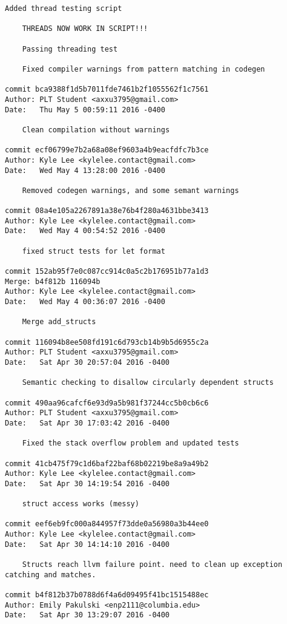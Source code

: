 \begin{lstlisting}[backgroundcolor=\color{white}]
    Added thread testing script
    
    THREADS NOW WORK IN SCRIPT!!!
    
    Passing threading test
    
    Fixed compiler warnings from pattern matching in codegen

commit bca9388f1d5b7011fde7461b2f1055562f1c7561
Author: PLT Student <axxu3795@gmail.com>
Date:   Thu May 5 00:59:11 2016 -0400

    Clean compilation without warnings

commit ecf06799e7b2a68a08ef9603a4b9eacfdfc7b3ce
Author: Kyle Lee <kylelee.contact@gmail.com>
Date:   Wed May 4 13:28:00 2016 -0400

    Removed codegen warnings, and some semant warnings

commit 08a4e105a2267891a38e76b4f280a4631bbe3413
Author: Kyle Lee <kylelee.contact@gmail.com>
Date:   Wed May 4 00:54:52 2016 -0400

    fixed struct tests for let format

commit 152ab95f7e0c087cc914c0a5c2b176951b77a1d3
Merge: b4f812b 116094b
Author: Kyle Lee <kylelee.contact@gmail.com>
Date:   Wed May 4 00:36:07 2016 -0400

    Merge add_structs

commit 116094b8ee508fd191c6d793cb14b9b5d6955c2a
Author: PLT Student <axxu3795@gmail.com>
Date:   Sat Apr 30 20:57:04 2016 -0400

    Semantic checking to disallow circularly dependent structs

commit 490aa96cafcf6e93d9a5b981f37244cc5b0cb6c6
Author: PLT Student <axxu3795@gmail.com>
Date:   Sat Apr 30 17:03:42 2016 -0400

    Fixed the stack overflow problem and updated tests

commit 41cb475f79c1d6baf22baf68b02219be8a9a49b2
Author: Kyle Lee <kylelee.contact@gmail.com>
Date:   Sat Apr 30 14:19:54 2016 -0400

    struct access works (messy)

commit eef6eb9fc000a844957f73dde0a56980a3b44ee0
Author: Kyle Lee <kylelee.contact@gmail.com>
Date:   Sat Apr 30 14:14:10 2016 -0400

    Structs reach llvm failure point. need to clean up exception catching and matches.

commit b4f812b37b0788d6f4a6d09495f41bc1515488ec
Author: Emily Pakulski <enp2111@columbia.edu>
Date:   Sat Apr 30 13:29:07 2016 -0400


\end{lstlisting}
